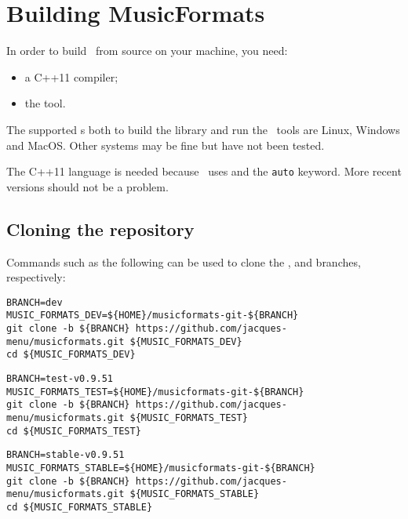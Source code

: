 
\chapter{Building MusicFormats}

In order to build \mf\ from source on your machine, you need:
\begin{itemize}
\item a C++11 compiler;
\item the  tool.
\end{itemize}

The supported \OS s both to build the library and run the \CLI\ tools are Linux, Windows and MacOS. Other systems may be fine but have not been tested.

The C++11 language is needed because \mf\ uses  and the {\tt auto} keyword. More recent versions should not be a problem.


\section{Cloning the repository}

Commands such as the following can be used to clone the ,  and  branches, respectively:

\begin{lstlisting}[language=Terminal]
BRANCH=dev
MUSIC_FORMATS_DEV=${HOME}/musicformats-git-${BRANCH}
git clone -b ${BRANCH} https://github.com/jacques-menu/musicformats.git ${MUSIC_FORMATS_DEV}
cd ${MUSIC_FORMATS_DEV}
\end{lstlisting}

\begin{lstlisting}[language=Terminal]
BRANCH=test-v0.9.51
MUSIC_FORMATS_TEST=${HOME}/musicformats-git-${BRANCH}
git clone -b ${BRANCH} https://github.com/jacques-menu/musicformats.git ${MUSIC_FORMATS_TEST}
cd ${MUSIC_FORMATS_TEST}
\end{lstlisting}

\begin{lstlisting}[language=Terminal]
BRANCH=stable-v0.9.51
MUSIC_FORMATS_STABLE=${HOME}/musicformats-git-${BRANCH}
git clone -b ${BRANCH} https://github.com/jacques-menu/musicformats.git ${MUSIC_FORMATS_STABLE}
cd ${MUSIC_FORMATS_STABLE}
\end{lstlisting}


